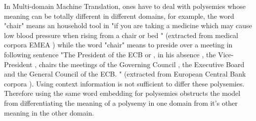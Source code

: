 \documentclass[11pt,a4paper]{article}
\begin{document}
In Multi-domain Machine Translation, ones have to deal with polysemies whose meaning can be totally different in different domains, for example, the word "chair" means an household tool in "if you are taking a medicine which may cause low blood pressure when rising from a chair or bed " (extracted from medical corpora EMEA \cite{Tiedemann2009RANLP5}) while the word "chair" means to preside over a meeting in following sentence "The President of the ECB or , in his absence , the Vice-President , chairs the meetings of the Governing Council , the Executive Board and the General Council of the ECB. " (extracted from European Central Bank corpora \cite{Tiedemann2009RANLP5}). Using context information is not sufficient to differ these polysemies. Therefore using the same word embedding for polysemies obstructs the model from differentiating the meaning of a polysemy in one domain from it's other meaning in the other domain.
\begin{table}[h]
\caption{Polysemies}
\label{table:polysemy}
\end{table}
\end{document}

